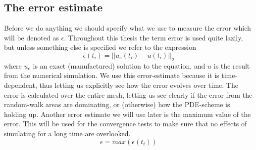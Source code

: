 \subsection{The error estimate}\label{error_estimate}

Before we do anything we should specify what we use to measure the error which will be denoted as $\epsilon$. 
Throughout this thesis the term error is used quite lazily, but unless something else is specified we refer to the expression 
\begin{equation}
 \epsilon(t_i) = ||u_e(t_i)-u(t_i)||_2
\end{equation}
where $u_e$ is an exact (manufactured) solution to the equation, and $u$ is the result from the numerical simulation. 
We use this error-estimate because it is time-dependent, thus letting us explicitly see how the error evolves over time. 
The error is calculated over the entire mesh, letting us see clearly if the error from the random-walk areas are dominating, or (otherwise) how the PDE-scheme is holding up.
Another error estimate we will use later is the maximum value of the error. 
This will be used for the convergence tests to make sure that no effects of simulating for a long time are overlooked. 
\begin{equation}
 \epsilon = max(\epsilon(t_i))
\end{equation}

